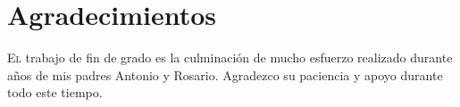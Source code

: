 \chapter*{Agradecimientos}
\pagestyle{empty}

\lettrine[lraise=-0.1, lines=2, loversize=0.25]{E}{l} trabajo de fin de grado
es la culminación de mucho esfuerzo realizado durante años de mis padres Antonio
y Rosario. Agradezco su paciencia y apoyo durante todo este tiempo.

{}%
\vspace{-.3cm}
{}%